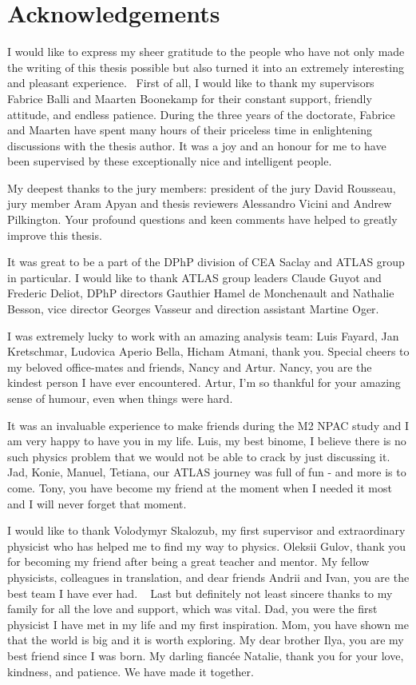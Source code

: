 \chapter*{Acknowledgements}


I would like to express my sheer gratitude to the people who have not only made the writing of this thesis possible but also turned it into an extremely interesting and pleasant experience. 
First of all, I would like to thank my supervisors Fabrice Balli and Maarten Boonekamp for their constant support, friendly attitude, and endless patience. During the three years of the doctorate, Fabrice and Maarten have spent many hours of their priceless time in enlightening discussions with the thesis author. It was a joy and an honour for me to have been supervised by these exceptionally nice and intelligent people. 

My deepest thanks to the jury members: president of the jury David Rousseau, jury member Aram Apyan and thesis reviewers Alessandro Vicini and Andrew Pilkington. Your profound questions and keen comments have helped to greatly improve this thesis. 

It was great to be a part of the DPhP division of CEA Saclay and ATLAS group in particular. I would like to thank ATLAS group leaders Claude Guyot and Frederic Deliot, DPhP directors Gauthier Hamel de Monchenault and Nathalie Besson, vice director Georges Vasseur and direction assistant Martine Oger.

I was extremely lucky to work with an amazing analysis team: Luis Fayard, Jan Kretschmar, Ludovica Aperio Bella, Hicham Atmani, thank you. Special cheers to my beloved office-mates and friends, Nancy and Artur. Nancy, you are the kindest person I have ever encountered. Artur, I’m so thankful for your amazing sense of humour, even when things were hard.

It was an invaluable experience to make friends during the M2 NPAC study and I am very happy to have you in my life. Luis, my best binome, I believe there is no such physics problem that we would not be able to crack by just discussing it. Jad, Konie, Manuel, Tetiana, our ATLAS journey was full of fun - and more is to come. Tony, you have become my friend at the moment when I needed it most and I will never forget that moment.

I would like to thank Volodymyr Skalozub, my first supervisor and extraordinary physicist who has helped me to find my way to physics. Oleksii Gulov, thank you for becoming my friend after being a great teacher and mentor. My fellow physicists, colleagues in translation, and dear friends Andrii and Ivan, you are the best team I have ever had.
 
Last but definitely not least sincere thanks to my family for all the love and support, which was vital. Dad, you were the first physicist I have met in my life and my first inspiration. Mom, you have shown me that the world is big and it is worth exploring. My dear brother Ilya, you are my best friend since I was born. My darling fiancée Natalie, thank you for your love, kindness, and patience. We have made it together.
